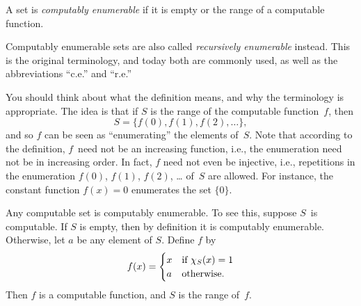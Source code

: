 \documentclass[../../../include/open-logic-section]{subfiles}
\begin{document}

\begin{defn}
A set is \emph{computably enumerable} if it is empty or the range of a
computable function.
\end{defn}

\begin{history}
Computably enumerable sets are also called \emph{recursively
  enumerable} instead. This is the original terminology, and today
both are commonly used, as well as the abbreviations ``c.e.'' and
``r.e.''
\end{history}

\begin{explain}
You should think about what the definition means, and why the
terminology is appropriate. The idea is that if $S$ is the range of
the computable function~$f$, then
\[
S = \{ f(0), f(1), f(2), \dots \},
\]
and so $f$ can be seen as ``enumerating'' the elements of~$S$. Note
that according to the definition, $f$~need not be an increasing
function, i.e., the enumeration need not be in increasing order. In
fact, $f$ need not even be injective, i.e., repetitions in the
enumeration $f(0)$, $f(1)$, $f(2)$, \dots{} of~$S$ are allowed. For
instance, the constant function $f(x) = 0$ enumerates the set $\{ 0
\}$.
\end{explain}

Any computable set is computably enumerable. To see this, suppose
$S$~is computable. If $S$ is empty, then by definition it is
computably enumerable. Otherwise, let $a$ be any element of
$S$. Define $f$ by
\[
f(x) =
\begin{cases}
x & \text{if $\chi_{S}(x) = 1$} \\
a & \text{otherwise.}
\end{cases}
\]
Then $f$ is a computable function, and $S$ is the range of~$f$.
\end{document}
